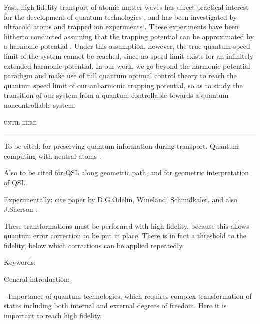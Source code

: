 \documentclass[aps,pra,reprint,a4paper,nofootinbib,superscriptaddress,numbers,longbibliography,showpacs,showkeys,floatfix]{revtex4-1}
\begin{document}
Fast, high-fidelity transport of atomic matter waves has direct practical interest for the development of quantum technologies \cite{Kielpinski:2002}, and has been investigated by ultracold atoms and trapped ion experiments  \cite{Couvert:2008,Bowler:2012,Walther:2012,Alonso:2016,Ness:2018}.
These experiments have been hitherto conducted assuming that the trapping potential can be approximated by a harmonic potential \cite{Murphy:2009a,Chen:2010d}.
%
Under this assumption, however, the true quantum speed limit of the system cannot be reached, since no speed limit exists for an infinitely extended harmonic potential.
%
In our work, we go beyond the harmonic potential paradigm and make use of full quantum optimal control theory to reach the quantum speed limit of our anharmonic trapping potential, so as to study the transition of our system from a quantum controllable towards a quantum noncontrollable system.



\vspace{1cm}
\noindent{}\textsc{until here}\\[-2mm]
\noindent\rule{\columnwidth}{0.4pt}
\vspace{2mm}


To be cited: \cite{Kaufmann:2018} for preserving quantum information during transport. Quantum computing with neutral atoms \cite{Weiss:2017}.

Also to be cited \cite{Bukov:2019} for QSL along geometric path, and \cite{Anandan:1990} for geometric interpretation of QSL. 

Experimentally: cite paper by D.G.Odelin, Wineland, Schmidkaler, and also J.Sherson \cite{Sorensen:2016a}.



These transformations must be performed with high fidelity, because this allows quantum error correction to be put in place.
%
There is in fact a threshold to the fidelity, below which corrections can be applied repeatedly.



\vspace{3mm}

Keywords:

General introduction:

- Importance of quantum technologies, which requires complex transformation of states including both internal and external degrees of freedom. Here it is important to reach high fidelity.
\end{document}

